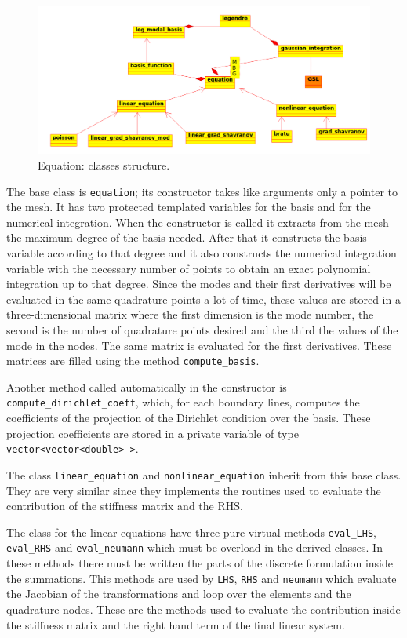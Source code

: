 \begin{figure}
\centering
\includegraphics[scale=0.3]{images/equation_diagram.png}
\caption{Equation: classes structure.}\label{fig:equation_diagram}
\end{figure}

The base class is \verb|equation|; its constructor takes like arguments only a pointer to the mesh. It has two protected templated variables for the basis and for the numerical integration. When the constructor is called it extracts from the mesh the maximum degree of the basis needed. After that it constructs the basis variable according to that degree and it also constructs the numerical integration variable with the necessary number of points to obtain an exact polynomial integration up to that degree. Since the modes and their first derivatives will be evaluated in the same quadrature points a lot of time, these values are stored in a three-dimensional matrix where the first dimension is the mode number, the second is the number of quadrature points desired and the third the values of the mode in the nodes. The same matrix is evaluated for the first derivatives. These matrices are filled using the method \verb|compute_basis|.

Another method called automatically in the constructor is \verb|compute_dirichlet_coeff|, which, for each boundary lines, computes the coefficients of the projection of the Dirichlet condition over the basis. These projection coefficients are stored in a private variable of type \verb|vector<vector<double> >|.
\medskip

The class \verb|linear_equation| and \verb|nonlinear_equation| inherit from this base class. They are very similar since they implements the routines used to evaluate the contribution of the stiffness matrix and the RHS.

The class for the linear equations have three pure virtual methods \verb|eval_LHS|, \verb|eval_RHS| and \verb|eval_neumann| which must be overload in the derived classes. In these methods there must be written the parts of the discrete formulation inside the summations. This methods are used by \verb|LHS|, \verb|RHS| and \verb|neumann| which evaluate the Jacobian of the transformations and loop over the elements and the quadrature nodes. These are the methods used to evaluate the contribution inside the stiffness matrix and the right hand term of the final linear system.

